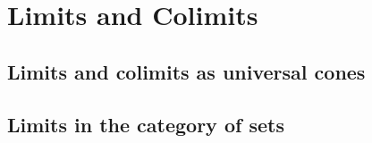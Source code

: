 \chapter{Limits and Colimits}

\section{Limits and colimits as universal cones}














\section{Limits in the category of sets}

